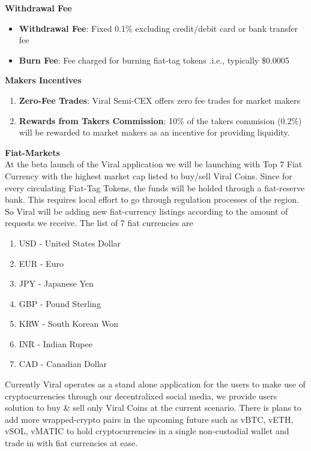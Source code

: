 \documentclass[10pt]{article}
\begin{document}
\textbf{Withdrawal Fee}
\begin{itemize}[leftmargin=+0.2in]
\item \textbf{Withdrawal Fee}: Fixed 0.1\% excluding credit/debit card or bank transfer fee
\item \textbf{Burn Fee}: Fee charged for burning fiat-tag tokens .i.e., typically \$0.0005
\end{itemize}



\textbf{Makers Incentives}
\begin{enumerate}[leftmargin=+0.2in]
\item \textbf{Zero-Fee Trades}: Viral Semi-CEX offers zero fee trades for market makers
\item \textbf{Rewards from Takers Commission}: 10\% of the takers commision (0.2\%) will be rewarded to market makers as an incentive for providing liquidity. 
\end{enumerate}


\textbf{Fiat-Markets}\\

At the beta launch of the Viral application we will be launching with Top 7 Fiat Currency with the highest market cap listed to buy/sell Viral Coins. Since for every circulating Fiat-Tag Tokens, the funds will be holded through a fiat-reserve bank. This requires local effort to go through regulation processes of the region. So Viral will be adding new fiat-currency listings according to the amount of requests we receive. The list of 7 fiat currencies are
\begin{enumerate}[leftmargin=+0.2in]
\item USD - United States Dollar
\item EUR - Euro
\item JPY - Japanese Yen
\item GBP - Pound Sterling
\item KRW - South Korean Won
\item INR - Indian Rupee
\item CAD - Canadian Dollar
\end{enumerate}
Currently Viral operates as a stand alone application for the users to make use of cryptocurrencies through our decentralixed social media, we provide users solution to buy \& sell only Viral Coins at the current scenario. There is plans to add more wrapped-crypto pairs in the upcoming future such as vBTC, vETH, vSOL, vMATIC to hold cryptocurrencies in a single non-custodial wallet and trade in with fiat currencies at ease.
\end{document}
